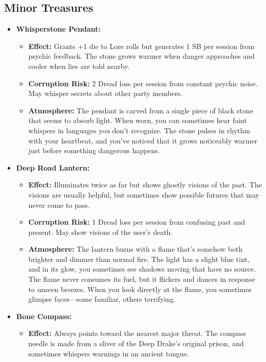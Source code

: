\documentclass[11pt]{article}
\begin{document}
\subsection{Minor Treasures}
\begin{itemize}
\item \textbf{Whisperstone Pendant:} 
  \begin{itemize}
  \item \textbf{Effect:} Grants +1 die to Lore rolls but generates 1 SB per session from psychic feedback. The stone grows warmer when danger approaches and cooler when lies are told nearby.
  \item \textbf{Corruption Risk:} 2 Dread loss per session from constant psychic noise. May whisper secrets about other party members.
  \item \textbf{Atmosphere:} The pendant is carved from a single piece of black stone that seems to absorb light. When worn, you can sometimes hear faint whispers in languages you don't recognize. The stone pulses in rhythm with your heartbeat, and you've noticed that it grows noticeably warmer just before something dangerous happens.
  \end{itemize}
\item \textbf{Deep Road Lantern:} 
  \begin{itemize}
  \item \textbf{Effect:} Illuminates twice as far but shows ghostly visions of the past. The visions are usually helpful, but sometimes show possible futures that may never come to pass.
  \item \textbf{Corruption Risk:} 1 Dread loss per session from confusing past and present. May show visions of the user's death.
  \item \textbf{Atmosphere:} The lantern burns with a flame that's somehow both brighter and dimmer than normal fire. The light has a slight blue tint, and in its glow, you sometimes see shadows moving that have no source. The flame never consumes its fuel, but it flickers and dances in response to unseen breezes. When you look directly at the flame, you sometimes glimpse faces---some familiar, others terrifying.
  \end{itemize}
\item \textbf{Bone Compass:} 
  \begin{itemize}
  \item \textbf{Effect:} Always points toward the nearest major threat. The compass needle is made from a sliver of the Deep Drake's original prison, and sometimes whispers warnings in an ancient tongue.

\end{itemize}
\end{itemize}
\end{document}
